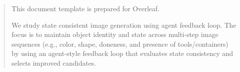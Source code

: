 \begin{abstract}

This document template is prepared for Overleaf.

We study state consistent image generation using agent feedback loop. The focus is to maintain object identity and state across multi-step image sequences (e.g., color, shape, doneness, and presence of tools/containers) by using an agent-style feedback loop that evaluates state consistency and selects improved candidates.

\end{abstract}
